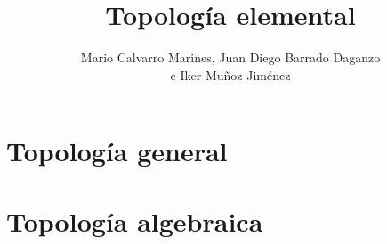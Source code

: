 \documentclass[10pt,a4paper,openright]{book}
\title{\Huge Topología elemental}
\author{Mario Calvarro Marines, Juan Diego Barrado Daganzo  \\
e Iker Muñoz Jiménez}
\date{}
\begin{document}
\frontmatter
\maketitle
\setcounter{tocdepth}{3}%
\tableofcontents


\mainmatter
\part{Topología general}









\part{Topología algebraica}






\end{document}
